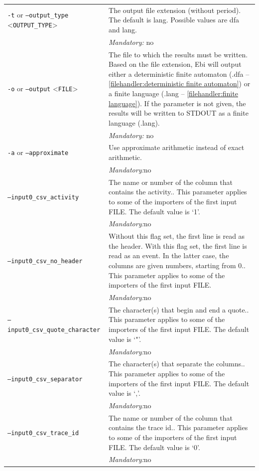 {\begin{tabularx}{\linewidth}{lX}
\texttt{-t} or \texttt{--output\_type} <\texttt{OUTPUT\_TYPE}> &
The output file extension (without period). The default is lang. Possible values are dfa and lang.\\
&\textit{Mandatory:} \quad no\\
\texttt{-o} or \texttt{--output} <\texttt{FILE}> &
The file to which the results must be written. Based on the file extension, Ebi will output either a deterministic finite automaton (.dfa -- \cref{filehandler:deterministic finite automaton}) or a finite language (.lang -- \cref{filehandler:finite language}).
If the parameter is not given, the results will be written to STDOUT as a finite language (.lang).\\
&\textit{Mandatory:} \quad no\\
\texttt{-a} or \texttt{--approximate} & Use approximate arithmetic instead of exact arithmetic.\\
&\textit{Mandatory:}\quad no\\
\texttt{--input0\_csv\_activity} & The name or number of the column that contains the activity.. This parameter applies to some of the importers of the first input FILE. The default value is `1'.\\
&\textit{Mandatory:}\quad no\\
\texttt{--input0\_csv\_no\_header} & Without this flag set, the first line is read as the header. 
    With this flag set, the first line is read as an event. In the latter case, the columns are given numbers, starting from 0.. This parameter applies to some of the importers of the first input FILE. \\
&\textit{Mandatory:}\quad no\\
\texttt{--input0\_csv\_quote\_character} & The character(s) that begin and end a quote.. This parameter applies to some of the importers of the first input FILE. The default value is `"'.\\
&\textit{Mandatory:}\quad no\\
\texttt{--input0\_csv\_separator} & The character(s) that separate the columns.. This parameter applies to some of the importers of the first input FILE. The default value is `,'.\\
&\textit{Mandatory:}\quad no\\
\texttt{--input0\_csv\_trace\_id} & The name or number of the column that contains the trace id.. This parameter applies to some of the importers of the first input FILE. The default value is `0'.\\
&\textit{Mandatory:}\quad no\\

\end{tabularx}}
